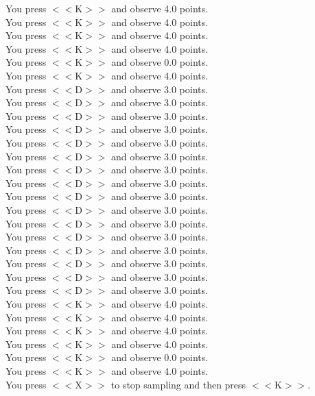 \documentclass[pdflatex,sn-nature]{sn-jnl}%
\theoremstyle{thmstyleone}%
\theoremstyle{thmstyletwo}%
\theoremstyle{thmstylethree}%
\begin{document}
You press $<<$K$>>$ and observe 4.0 points. $~$\\ 
You press $<<$K$>>$ and observe 4.0 points. $~$\\ 
You press $<<$K$>>$ and observe 4.0 points. $~$\\ 
You press $<<$K$>>$ and observe 4.0 points. $~$\\ 
You press $<<$K$>>$ and observe 0.0 points. $~$\\ 
You press $<<$K$>>$ and observe 4.0 points. $~$\\ 
You press $<<$D$>>$ and observe 3.0 points. $~$\\ 
You press $<<$D$>>$ and observe 3.0 points. $~$\\ 
You press $<<$D$>>$ and observe 3.0 points. $~$\\ 
You press $<<$D$>>$ and observe 3.0 points. $~$\\ 
You press $<<$D$>>$ and observe 3.0 points. $~$\\ 
You press $<<$D$>>$ and observe 3.0 points. $~$\\ 
You press $<<$D$>>$ and observe 3.0 points. $~$\\ 
You press $<<$D$>>$ and observe 3.0 points. $~$\\ 
You press $<<$D$>>$ and observe 3.0 points. $~$\\ 
You press $<<$D$>>$ and observe 3.0 points. $~$\\ 
You press $<<$D$>>$ and observe 3.0 points. $~$\\ 
You press $<<$D$>>$ and observe 3.0 points. $~$\\ 
You press $<<$D$>>$ and observe 3.0 points. $~$\\ 
You press $<<$D$>>$ and observe 3.0 points. $~$\\ 
You press $<<$D$>>$ and observe 3.0 points. $~$\\ 
You press $<<$D$>>$ and observe 3.0 points. $~$\\ 
You press $<<$K$>>$ and observe 4.0 points. $~$\\ 
You press $<<$K$>>$ and observe 4.0 points. $~$\\ 
You press $<<$K$>>$ and observe 4.0 points. $~$\\ 
You press $<<$K$>>$ and observe 4.0 points. $~$\\ 
You press $<<$K$>>$ and observe 0.0 points. $~$\\ 
You press $<<$K$>>$ and observe 4.0 points. $~$\\ 
You press $<<$X$>>$ to stop sampling and then press $<<$K$>>$. $~$\\ 
\end{document}
